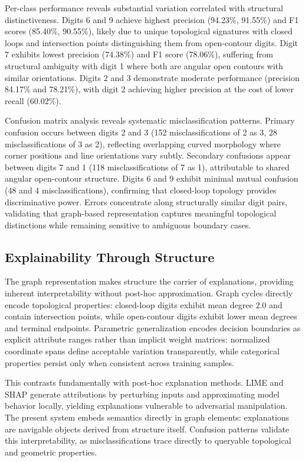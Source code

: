 \documentclass[a4paper,10pt]{article}
\begin{document}
Per-class performance reveals substantial variation correlated with structural distinctiveness. Digits 6 and 9 achieve highest precision (94.23\%, 91.55\%) and F1 scores (85.40\%, 90.55\%), likely due to unique topological signatures with closed loops and intersection points distinguishing them from open-contour digits. Digit 7 exhibits lowest precision (74.38\%) and F1 score (78.06\%), suffering from structural ambiguity with digit 1 where both are angular open contours with similar orientations. Digits 2 and 3 demonstrate moderate performance (precision 84.17\% and 78.21\%), with digit 2 achieving higher precision at the cost of lower recall (60.02\%).

Confusion matrix analysis reveals systematic misclassification patterns. Primary confusion occurs between digits 2 and 3 (152 misclassifications of 2 as 3, 28 misclassifications of 3 as 2), reflecting overlapping curved morphology where corner positions and line orientations vary subtly. Secondary confusions appear between digits 7 and 1 (118 misclassifications of 7 as 1), attributable to shared angular open-contour structure. Digits 6 and 9 exhibit minimal mutual confusion (48 and 4 misclassifications), confirming that closed-loop topology provides discriminative power. Errors concentrate along structurally similar digit pairs, validating that graph-based representation captures meaningful topological distinctions while remaining sensitive to ambiguous boundary cases.

\subsection{Explainability Through Structure}

The graph representation makes structure the carrier of explanations, providing inherent interpretability without post-hoc approximation. Graph cycles directly encode topological properties: closed-loop digits exhibit mean degree 2.0 and contain intersection points, while open-contour digits exhibit lower mean degrees and terminal endpoints. Parametric generalization encodes decision boundaries as explicit attribute ranges rather than implicit weight matrices: normalized coordinate spans define acceptable variation transparently, while categorical properties persist only when consistent across training samples.

This contrasts fundamentally with post-hoc explanation methods. LIME and SHAP generate attributions by perturbing inputs and approximating model behavior locally, yielding explanations vulnerable to adversarial manipulation. The present system embeds semantics directly in graph elements: explanations are navigable objects derived from structure itself. Confusion patterns validate this interpretability, as misclassifications trace directly to queryable topological and geometric properties.
\end{document}
